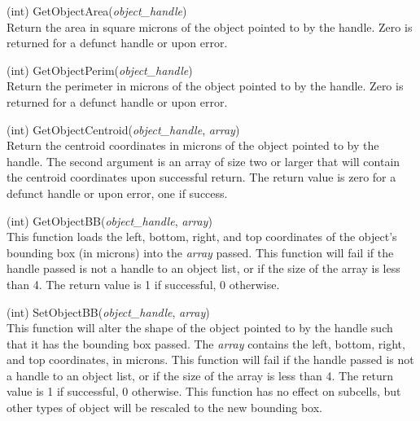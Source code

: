 \begin{description}
\item{(int) \vt GetObjectArea({\it object\_handle\/})}\\
Return the area in square microns of the object pointed to by the
handle.  Zero is returned for a defunct handle or upon error.

\item{(int) \vt GetObjectPerim({\it object\_handle\/})}\\
Return the perimeter in microns of the object pointed to by the
handle.  Zero is returned for a defunct handle or upon error.

\item{(int) \vt GetObjectCentroid({\it object\_handle\/}, {\it array\/})}\\
Return the centroid coordinates in microns of the object pointed to by
the handle.  The second argument is an array of size two or larger
that will contain the centroid coordinates upon successful return. 
The return value is zero for a defunct handle or upon error, one if
success.

\item{(int) \vt GetObjectBB({\it object\_handle\/}, {\it array\/})}\\
This function loads the left, bottom, right, and top coordinates of
the object's bounding box (in microns) into the {\it array} passed. 
This function will fail if the handle passed is not a handle to an
object list, or if the size of the array is less than 4.  The return
value is 1 if successful, 0 otherwise.

\item{(int) \vt SetObjectBB({\it object\_handle\/}, {\it array\/})}\\
This function will alter the shape of the object pointed to by the
handle such that it has the bounding box passed.  The {\it array}
contains the left, bottom, right, and top coordinates, in microns. 
This function will fail if the handle passed is not a handle to an
object list, or if the size of the array is less than 4.  The return
value is 1 if successful, 0 otherwise.  This function has no effect on
subcells, but other types of object will be rescaled to the new
bounding box.


\end{description}
